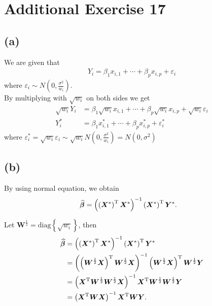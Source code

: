 \section*{Additional Exercise 17}
\subsection*{(a)}

We are given that
\begin{align*}
Y_{i} = \beta_{1}x_{i,1} + \cdots + \beta_{p}x_{i,p} + \varepsilon_{i}
\end{align*}
where $\varepsilon_{i} \sim N\left(0,\frac{\sigma^{2}}{w_{i}}\right)$.\\
By multiplying with $\sqrt{w_{i}}$ on both sides we get
\begin{align*}
\sqrt{w_{i}}Y_{i} &= \beta_{1}\sqrt{w_{i}}x_{i,1} + \cdots + \beta_{p}\sqrt{w_{i}}x_{i,p} + \sqrt{w_{i}}\varepsilon_{i}\\
Y_{i}^{*} &= \beta_{1}x_{i,1}^{*} + \cdots + \beta_{p}x_{i,p}^{*} + \varepsilon_{i}^{*}
\end{align*}
where $\varepsilon_{i}^{*} = \sqrt{w_{i}}\varepsilon_{i} \sim \sqrt{w_{i}}N\left(0,\frac{\sigma^{2}}{w_{i}}\right) = N\left(0,\sigma^{2}\right)$


\vspace{\baselineskip}
\subsection*{(b)}
By using normal equation, we obtain
\begin{align*}
\widehat{\bm{\beta}} &= \left(\left(\bm{X}^{*}\right)^{\rm T}\bm{X}^{*}\right)^{-1}\left(\bm{X}^{*}\right)^{\rm T}\bm{Y}^{*}.
\end{align*}

Let $\bm{W}^{\frac{1}{2}} = \mathrm{diag}\left\{\sqrt{w_{i}}\right\}$, then
\begin{align*}
\widehat{\bm{\beta}} &= \left(\left(\bm{X}^{*}\right)^{\rm T}\bm{X}^{*}\right)^{-1}\left(\bm{X}^{*}\right)^{\rm T}\bm{Y}^{*}\\
&= \left(\left(\bm{W}^{\frac{1}{2}}\bm{X}\right)^{\rm T}\bm{W}^{\frac{1}{2}}\bm{X}\right)^{-1}\left(\bm{W}^{\frac{1}{2}}\bm{X}\right)^{\rm T}\bm{W}^{\frac{1}{2}}\bm{Y}\\
&= \left(\bm{X}^{\rm T}\bm{W}^{\frac{1}{2}}\bm{W}^{\frac{1}{2}}\bm{X}\right)^{-1}\bm{X}^{\rm T}\bm{W}^{\frac{1}{2}}\bm{W}^{\frac{1}{2}}\bm{Y}\\
&= \left(\bm{X}^{\rm T}\bm{W}\bm{X}\right)^{-1}\bm{X}^{\rm T}\bm{W}\bm{Y}.
\end{align*}